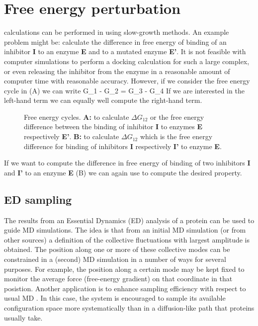 \section{Free energy perturbation}
\label{sec:fepalg}
 calculations can be performed
in {\gromacs} using slow-growth methods. An example problem might be:
calculate the difference in free energy of binding of an inhibitor {\bf I}
to an enzyme {\bf E} and to a mutated enzyme {\bf E'}.
It is not feasible with computer simulations to perform a docking
calculation for such a large complex, or even releasing the inhibitor from
the enzyme in a reasonable amount of computer time with reasonable accuracy.
However, if we consider the free energy cycle in (A)
we can write
\beq
\Delta G_1 - \Delta G_2	=	\Delta G_3 - \Delta G_4
\label{eqn:ddg}
\eeq
If we are interested in the left-hand term we can equally well compute
the right-hand term.
\begin{figure}
\centerline{\hspace{2cm}}
\caption{Free energy cycles. {\bf A:} to calculate $\Delta G_{12}$ or the free energy difference between the binding of inhibitor {\bf I} to enzymes {\bf E} respectively {\bf E'}. {\bf B:} to calculate $\Delta G_{12}$ which is the free energy difference for binding of inhibitors {\bf I} respectively {\bf I'} to enzyme {\bf E}.}
\label{fig:free}
\end{figure}

If we want to compute the difference in free energy of binding of two
inhibitors {\bf I} and {\bf I'} to an enzyme {\bf E} (B)
we can again use  to compute the desired property.

\subsection{ED sampling}

The results from an Essential Dynamics (ED) analysis \cite{Amadei93}
of a protein can be used to guide MD simulations. The idea is that
from an initial MD simulation (or from other sources) a definition of
the collective fluctuations with largest amplitude is obtained. The
position along one or more of these collective modes can be
constrained in a (second) MD simulation in a number of ways for
several purposes. For example, the position along a certain mode may
be kept fixed to monitor the average force (free-energy gradient) on
that coordinate in that posistion. Another application is to enhance
sampling efficiency with respect to usual MD
\cite{Degroot96a,Degroot96b}. In this case, the system is encouraged
to sample its available configuration space more systematically than
in a diffusion-like path that proteins usually take.

